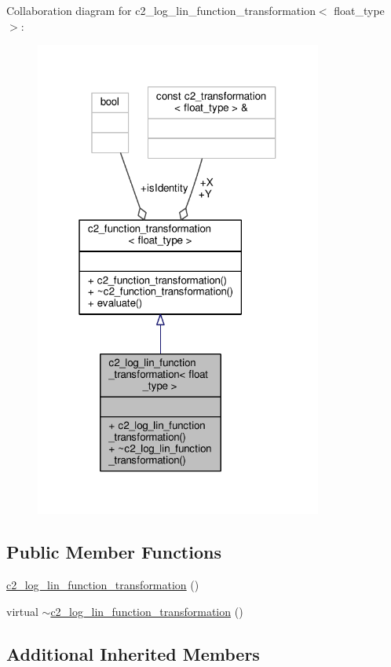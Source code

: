 Collaboration diagram for c2\+\_\+log\+\_\+lin\+\_\+function\+\_\+transformation$<$ float\+\_\+type $>$\+:
\nopagebreak
\begin{figure}[H]
\begin{center}
\leavevmode
\includegraphics[width=268pt]{classc2__log__lin__function__transformation__coll__graph}
\end{center}
\end{figure}
\subsection*{Public Member Functions}
\begin{DoxyCompactItemize}
\item 
\hyperlink{classc2__log__lin__function__transformation_a89e8d304ac6601bdd61e86a6c16aff50}{c2\+\_\+log\+\_\+lin\+\_\+function\+\_\+transformation} ()
\item 
virtual \hyperlink{classc2__log__lin__function__transformation_a3477d5a1765e894842b122ade66334cb}{$\sim$c2\+\_\+log\+\_\+lin\+\_\+function\+\_\+transformation} ()
\end{DoxyCompactItemize}
\subsection*{Additional Inherited Members}


